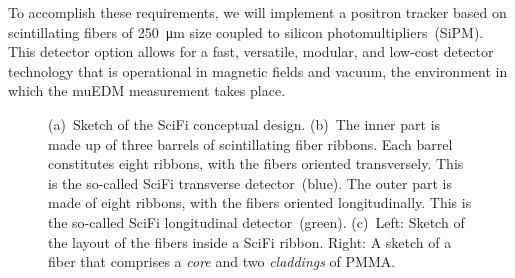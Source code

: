 \begin{refsection}
    To accomplish these requirements, we will implement a positron tracker based on scintillating fibers of \SI{250}{\micro\meter} size coupled to silicon photomultipliers~(SiPM). 
    This detector option allows for a fast, versatile, modular, and low-cost detector technology that is operational in magnetic fields and vacuum, the environment in which the muEDM measurement takes place.

    
\begin{figure}
    \centering
		\hfill
		\hfill
    \caption{(a)~Sketch of the SciFi conceptual design. (b)~The inner part is made up of three barrels of scintillating fiber ribbons. Each barrel constitutes eight ribbons, with the fibers oriented transversely. This is the so-called SciFi transverse detector~(blue). The outer part is made of eight ribbons, with the fibers oriented longitudinally. This is the so-called SciFi longitudinal detector~(green). (c)~Left: Sketch of the layout of the fibers inside a SciFi ribbon. Right: A sketch of a fiber that comprises a \textit{core} and two \textit{claddings} of PMMA\@.}
    \label{fig:SciFi_ConceptualDesign}
\end{figure}


\end{refsection}
